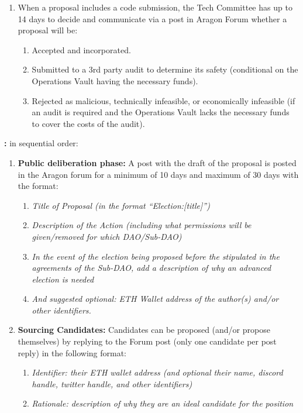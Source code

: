 \begin{enumerate}
\begin{enumerate}
\begin{enumerate}
			\item When a proposal includes a code submission, the Tech Committee has up to 14 days to decide and communicate via a post in Aragon Forum whether a proposal will be:
			\begin{enumerate}
				\item Accepted and incorporated.
				\item Submitted to a 3rd party audit to determine its safety (conditional on the Operations Vault having the necessary funds).
				\item Rejected as malicious, technically infeasible, or economically infeasible (if an audit is required and the Operations Vault lacks the necessary funds to cover the costs of the audit).
			\end{enumerate}
		
		\end{enumerate}
		
		\textbf{:} in sequential order:
		\begin{enumerate}
			
			\item \textbf{Public deliberation phase:} A post with the draft of the proposal is posted in the Aragon forum for a minimum of 10 days and maximum of 30 days with the format:
			\begin{enumerate}
				\item \textit{Title of Proposal (in the format “Election:[title]”)}
				\item \textit{Description of the Action (including what permissions will be given/removed for which \ac{DAO}/Sub-\ac{DAO})}
				\item \textit{In the event of the election being proposed before the stipulated in the agreements of the Sub-\ac{DAO}, add a description of why an advanced election is needed}
				\item \textit{And suggested optional: ETH Wallet address of the author(s) and/or other identifiers.}
			\end{enumerate}

			\item \textbf{Sourcing Candidates:} Candidates can be proposed (and/or propose themselves) by replying to the Forum post (only one candidate per post reply) in the following format:
			\begin{enumerate}
				\item \textit{Identifier: their ETH wallet address (and optional their name, discord handle, twitter handle, and other identifiers)}
				\item \textit{Rationale: description of why they are an ideal candidate for the position}
			\end{enumerate}


\end{enumerate}
\end{enumerate}
\end{enumerate}
